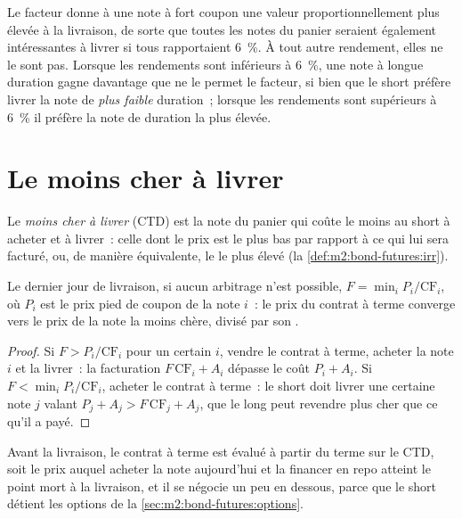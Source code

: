 Le facteur donne à une note à fort coupon une valeur proportionnellement plus élevée
à la livraison, de sorte que toutes les notes du panier seraient également intéressantes à livrer
si tous rapportaient 6~\%. À tout autre rendement, elles ne le sont pas. Lorsque les rendements sont
inférieurs à 6~\%, une note à longue duration gagne davantage que ne le permet le facteur, si bien que le short
préfère livrer la note de \emph{plus faible} duration~; lorsque les rendements sont supérieurs à 6~\%
il préfère la note de duration la plus élevée.

\section{Le moins cher à livrer}

\begin{definition}\label{def:m2:bond-futures:ctd}
Le \emph{moins cher à livrer} (CTD) est la note du panier
qui coûte le moins au short à acheter et à livrer~: celle dont le prix est le plus bas
par rapport à ce qui lui sera facturé, ou, de manière équivalente, le
 le plus élevé (la \cref{def:m2:bond-futures:irr}).
\end{definition}

\begin{proposition}[À la livraison]\label{prop:m2:bond-futures:atdelivery}
Le dernier jour de livraison, si aucun arbitrage n'est possible, $F = \min_i
P_i/\mathrm{CF}_i$, où $P_i$ est le prix pied de coupon de la note $i$~: le prix du contrat à terme
converge vers le prix de la note la moins chère, divisé par son .
\end{proposition}
\begin{proof}
Si $F > P_i/\mathrm{CF}_i$ pour un certain $i$, vendre le contrat à terme, acheter la note $i$ et
la livrer~: la facturation $F\,\mathrm{CF}_i + A_i$ dépasse le coût $P_i + A_i$. Si
$F < \min_i P_i/\mathrm{CF}_i$, acheter le contrat à terme~: le short doit livrer une certaine note
$j$ valant $P_j + A_j > F\,\mathrm{CF}_j + A_j$, que le long peut revendre
plus cher que ce qu'il a payé.
\end{proof}

Avant la livraison, le contrat à terme est évalué à partir du terme sur le CTD, soit le prix auquel
acheter la note aujourd'hui et la financer en repo atteint le point mort à la livraison, et
il se négocie un peu en dessous, parce que le short détient les
options de la \cref{sec:m2:bond-futures:options}.

